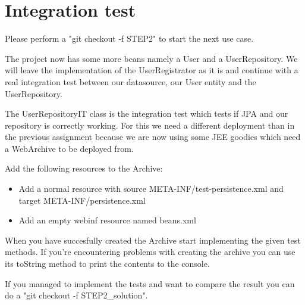 \documentclass[paper=a4, fontsize=11pt]{scrartcl}
\begin{document}
\section{Integration test}
Please perform a "git checkout -f STEP2" to start the next use case.
\par
The project now has some more beans namely a User and a UserRepository. We will
leave the implementation of the UserRegistrator as it is and continue with a real
integration test between our datasource, our User entity and the UserRepository.
\par
The UserRepositoryIT class is the integration test which tests if JPA and our
repository is correctly working. For this we need a different deployment than in
the previous assignment because we are now using some JEE goodies which need a
WebArchive to be deployed from.
\par
Add the following resources to the Archive:
\begin{itemize}
	\item Add a normal resource with source META-INF/test-persistence.xml and
		target META-INF/persistence.xml
  \item Add an empty webinf resource named beans.xml
\end{itemize}
When you have succesfully created the Archive start implementing the given test
methods. If you're encountering problems with creating the archive you can use
its toString method to print the contents to the console.
\par
If you managed to implement the tests and want to compare the result you can do
a "git checkout -f STEP2\_solution".
\end{document}
